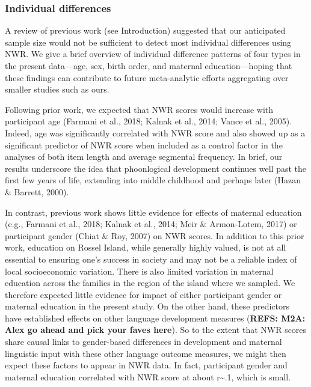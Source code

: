 \documentclass[english,,man,floatsintext]{apa6}
\begin{document}
\hypertarget{individual-differences}{%
\subsubsection{Individual differences}\label{individual-differences}}

A review of previous work (see Introduction) suggested that our anticipated sample size would not be sufficient to detect most individual differences using NWR. We give a brief overview of individual difference patterns of four types in the present data---age, sex, birth order, and maternal education---hoping that these findings can contribute to future meta-analytic efforts aggregating over smaller studies such as ours.

Following prior work, we expected that NWR scores would increase with participant age (Farmani et al., 2018; Kalnak et al., 2014; Vance et al., 2005). Indeed, age was significantly correlated with NWR score and also showed up as a significant predictor of NWR score when included as a control factor in the analyses of both item length and average segmental frequency. In brief, our results underscore the idea that phoonlogical development continues well past the first few years of life, extending into middle childhood and perhaps later (Hazan \& Barrett, 2000).

In contrast, previous work shows little evidence for effects of maternal education (e.g., Farmani et al., 2018; Kalnak et al., 2014; Meir \& Armon-Lotem, 2017) or participant gender (Chiat \& Roy, 2007) on NWR scores. In addition to this prior work, education on Rossel Island, while generally highly valued, is not at all essential to ensuring one's success in society and may not be a reliable index of local socioeconomic variation. There is also limited variation in maternal education across the families in the region of the island where we sampled. We therefore expected little evidence for impact of either participant gender or maternal education in the present study. On the other hand, these predictors have established effects on other language development measures (\textbf{REFS: M2A: Alex go ahead and pick your faves here}). So to the extent that NWR scores share causal links to gender-based differences in development and maternal linguistic input with these other language outcome measures, we might then expect these factors to appear in NWR data. In fact, participant gender and maternal education correlated with NWR score at about r\textasciitilde{}.1, which is small.
\end{document}
